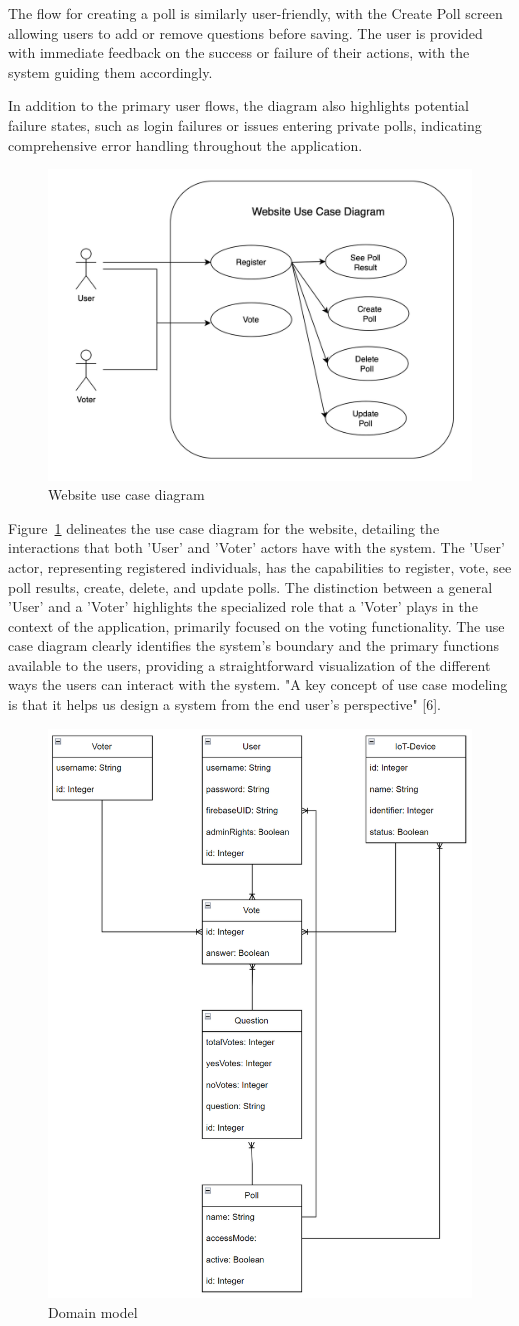The flow for creating a poll is similarly user-friendly, with the Create Poll screen allowing users to add or remove questions before saving. The user is provided with immediate feedback on the success or failure of their actions, with the system guiding them accordingly.

In addition to the primary user flows, the diagram also highlights potential failure states, such as login failures or issues entering private polls, indicating comprehensive error handling throughout the application.
    


\begin{figure}[!htbp]
\centering
\includegraphics[width=0.5\linewidth]{figs/UserDiagram.png}
\caption{Website use case diagram}
\label{fig:userdiagram}
\end{figure}

Figure~\ref{fig:userdiagram} delineates the use case diagram for the website, detailing the interactions that both 'User' and 'Voter' actors have with the system. The 'User' actor, representing registered individuals, has the capabilities to register, vote, see poll results, create, delete, and update polls. The distinction between a general 'User' and a 'Voter' highlights the specialized role that a 'Voter' plays in the context of the application, primarily focused on the voting functionality. The use case diagram clearly identifies the system's boundary and the primary functions available to the users, providing a straightforward visualization of the different ways the users can interact with the system. "A key concept of use case modeling is that it helps us design a system from the end user's perspective" [6].


\begin{figure}[!htbp]
\centering
\includegraphics[width=0.4\linewidth]{figs/DomainModel.png}
\caption{Domain model}
\label{fig:domainmodel}
\end{figure}


